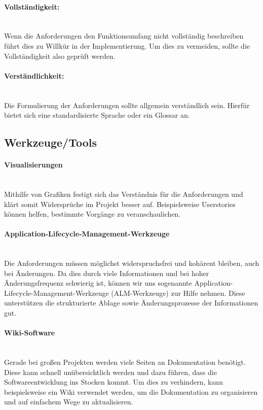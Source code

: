 \documentclass[a4paper, ngerman, 12pt, usenames, dvipsnames]{article}
\begin{document}
\paragraph{Vollständigkeit:}\mbox{} \\
Wenn die Anforderungen den Funktionsumfang nicht vollständig beschreiben führt dies zu Willkür in der Implementierung. Um dies zu vermeiden, sollte die Vollständigkeit also geprüft werden.
\paragraph{Verständlichkeit:}\mbox{} \\
Die Formulierung der Anforderungen sollte allgemein verständlich sein. Hierfür bietet sich eine standardisierte Sprache oder ein Glossar an.

\pagebreak
\subsection{Werkzeuge/Tools}

\paragraph{Visualisierungen}\mbox{} \\
Mithilfe von Grafiken festigt sich das Verständnis für die Anforderungen und klärt somit Widersprüche im Projekt besser auf. Beispielsweise Userstories können helfen, bestimmte Vorgänge zu veranschaulichen.
\paragraph{Application-Lifecycle-Management-Werkzeuge}\mbox{} \\
Die Anforderungen müssen möglichst widerspruchsfrei und kohärent bleiben, auch bei Änderungen. Da dies durch viele Informationen und bei hoher Änderungsfrequenz schwierig ist, können wir uns sogenannte Application-Lifecycle-Management-Werkzeuge (ALM-Werkzeuge) zur Hilfe nehmen. Diese unterstützen die strukturierte Ablage sowie Änderungsprozesse der Informationen gut.
\paragraph{Wiki-Software}\mbox{} \\
Gerade bei großen Projekten werden viele Seiten an Dokumentation benötigt. Diese kann schnell unübersichtlich werden und dazu führen, dass die Softwareentwicklung ins Stocken kommt. Um dies zu verhindern, kann beispielsweise ein Wiki verwendet werden, um die Dokumentation zu organisieren und auf einfachem Wege zu aktualisieren.
\end{document}
